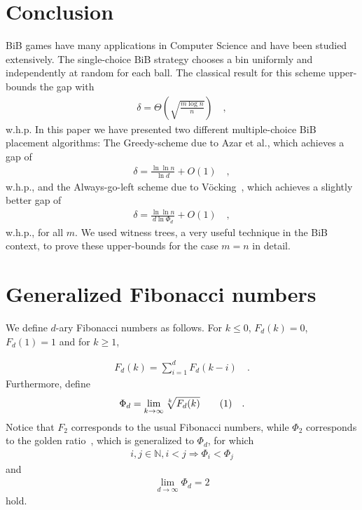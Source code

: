 \documentclass[a4paper,12pt]{article}
\newcommand\numberthis{\addtocounter{equation}{1}\tag{\theequation}}
\newcommand\neqn[1]{\numberthis\label{eqn:#1}}
\begin{document}
\section{Conclusion}
\label{sec:conclusion}
BiB games have many applications in Computer Science and have been studied extensively. The single-choice BiB strategy chooses a bin uniformly and independently at random for each ball. The classical result for this scheme upper-bounds the gap with~\cite{RS98}
\begin{align*}
\delta =  \Theta\left(\sqrt{\frac{m  \log n}{n}}\right) \quad ,
\end{align*}
w.h.p.
In this paper we have presented two different multiple-choice BiB placement algorithms: The Greedy-scheme due to Azar et al.\cite{ABKU99}, which achieves a gap of 
\begin{align*}
\delta = \frac{\ln\ln n}{\ln d} + O(1) \quad ,
\end{align*}
w.h.p., and the Always-go-left scheme due to V\"ocking~\cite{VOC03}, which achieves a slightly better gap of
\begin{align*}
\delta = \frac{\ln \ln n}{d \ln \Phi_d} + O(1) \quad ,
\end{align*}
w.h.p., for all $m$. We used witness trees, a very useful technique in the BiB context, to prove these upper-bounds for the case $m=n$ in detail.


\appendix
\section{Generalized Fibonacci numbers}
\label{sec:fibonacci}
We define $d$-ary Fibonacci numbers as follows. For $k \leq0$, $F_d(k) = 0$, $F_d(1) = 1$ and for $k \geq 1$,

\begin{align*}
F_d(k) = \sum_{i=1}^{d}F_d(k-i) \quad .
\end{align*}
Furthermore, define 
\begin{align*}
\Phi_d = \lim_{k \rightarrow \infty} \sqrt[k]{F_d(k)} \neqn{goldenFib} \quad .
\end{align*}
Notice that $F_2$ corresponds to the usual Fibonacci numbers, while $\Phi_2 $ corresponds to the golden ratio~\cite{Knuth73}, which is generalized to $\Phi_d$, for which 
\begin{align*}
i, j \in \mathbb{N}, i < j \Rightarrow \Phi_i < \Phi_j
\end{align*}
and 
\begin{align*}
\lim_{d\rightarrow \infty} \Phi_d = 2
\end{align*}
hold.
\end{document}

